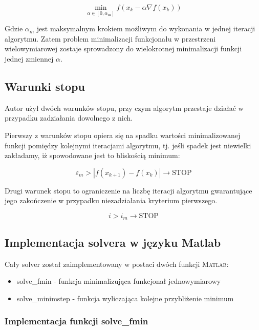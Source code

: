 \documentclass[12pt]{article}
\begin{document}
\begin{equation}
    \min_{\alpha \in [0, \alpha_{\textrm{m}}]} f(x_{k} - \alpha \nabla
    f(x_{k}))
\end{equation}

Gdzie $\alpha_{m}$ jest maksymalnym krokiem możliwym do wykonania w jednej
iteracji algorytmu. Zatem problem minimalizacji funkcjonału w przestrzeni
wielowymiarowej zostaje sprowadzony do wielokrotnej minimalizacji funkcji
jednej zmiennej $\alpha$.

\subsection*{Warunki stopu}

Autor użył dwóch warunków stopu, przy czym algorytm przestaje działać w
przypadku zadziałania dowolnego z nich.

Pierwszy z warunków stopu opiera się na spadku wartości minimalizowanej funkcji
pomiędzy kolejnymi iteracjami algorytmu, tj. jeśli spadek jest niewielki
zakładamy, iż spowodowane jest to bliskością minimum:

\begin{equation}
    \varepsilon_m > |f(x_{k+1}) - f(x_{k})| \rightarrow \textrm{STOP}
\end{equation}

Drugi warunek stopu to ograniczenie na liczbę iteracji algorytmu gwarantujące
jego zakończenie w przypadku niezadziałania kryterium pierwszego.

\begin{equation}
    i > i_{m} \rightarrow \textrm{STOP}
\end{equation}

\subsection*{Implementacja solvera w języku Matlab}

Cały solver został zaimplementowany w postaci dwóch funkcji \textsc{Matlab}:

\begin{itemize}
  \item solve\_fmin - funkcja minimalizująca funkcjonał jednowymiarowy
  \item solve\_minimstep - funkcja wyliczająca kolejne przybliżenie minimum
\end{itemize}

\subsubsection*{Implementacja funkcji solve\_fmin}
\end{document}
